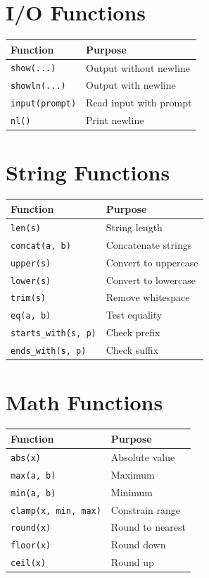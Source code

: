 \documentclass[11pt,twoside,openright]{book}
\begin{document}
\section{I/O Functions}

\begin{center}
\begin{tabular}{|l|l|}
\hline
\textbf{Function} & \textbf{Purpose} \\
\hline
\texttt{show(...)} & Output without newline \\
\texttt{showln(...)} & Output with newline \\
\texttt{input(prompt)} & Read input with prompt \\
\texttt{nl()} & Print newline \\
\hline
\end{tabular}
\end{center}

\section{String Functions}

\begin{center}
\begin{tabular}{|l|l|}
\hline
\textbf{Function} & \textbf{Purpose} \\
\hline
\texttt{len(s)} & String length \\
\texttt{concat(a, b)} & Concatenate strings \\
\texttt{upper(s)} & Convert to uppercase \\
\texttt{lower(s)} & Convert to lowercase \\
\texttt{trim(s)} & Remove whitespace \\
\texttt{eq(a, b)} & Test equality \\
\texttt{starts\_with(s, p)} & Check prefix \\
\texttt{ends\_with(s, p)} & Check suffix \\
\hline
\end{tabular}
\end{center}

\section{Math Functions}

\begin{center}
\begin{tabular}{|l|l|}
\hline
\textbf{Function} & \textbf{Purpose} \\
\hline
\texttt{abs(x)} & Absolute value \\
\texttt{max(a, b)} & Maximum \\
\texttt{min(a, b)} & Minimum \\
\texttt{clamp(x, min, max)} & Constrain range \\
\texttt{round(x)} & Round to nearest \\
\texttt{floor(x)} & Round down \\
\texttt{ceil(x)} & Round up \\
\hline
\end{tabular}
\end{center}
\end{document}
